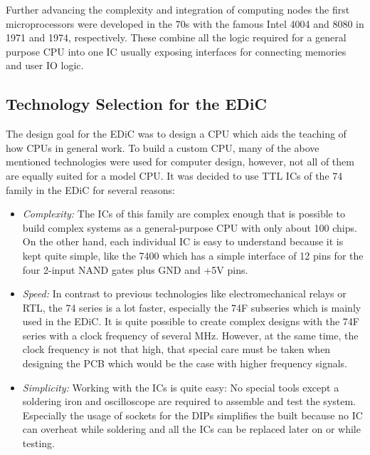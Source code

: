 Further advancing the complexity and integration of computing nodes the first microprocessors were developed in the 70s with the famous Intel 4004 and 8080 in 1971 and 1974, respectively.
These combine all the logic required for a general purpose \gls{CPU} into one \gls{IC} usually exposing interfaces for connecting memories and user \gls{IO} logic.

\subsection{Technology Selection for the \gls{EDiC}}
The design goal for the \gls{EDiC} was to design a \gls{CPU} which aids the teaching of how \glspl{CPU} in general work.
To build a custom \gls{CPU}, many of the above mentioned technologies were used for computer design, however, not all of them are equally suited for a model \gls{CPU}.
It was decided to use \gls{TTL} \glspl{IC} of the 74 family in the \gls{EDiC} for several reasons:
\begin{itemize}
  \item \emph{Complexity:} The \glspl{IC} of this family are complex enough that is possible to build complex systems as a general-purpose \gls{CPU} with only about 100 chips.
  On the other hand, each individual \gls{IC} is easy to understand because it is kept quite simple, like the 7400 which has a simple interface of 12 pins for the four 2-input NAND gates plus GND and +5V pins.

  \item \emph{Speed:} In contrast to previous technologies like electromechanical relays or \gls{RTL}, the 74 series is a lot faster, especially the 74F subseries which is mainly used in the \gls{EDiC}.
  It is quite possible to create complex designs with the 74F series with a clock frequency of several \unit{\mega\hertz}.
  However, at the same time, the clock frequency is not that high, that special care must be taken when designing the \gls{PCB} which would be the case with higher frequency signals.

  \item \emph{Simplicity:} Working with the \glspl{IC} is quite easy: No special tools except a soldering iron and oscilloscope are required to assemble and test the system.
  Especially the usage of sockets for the \glspl{DIP} simplifies the built because no \gls{IC} can overheat while soldering and all the \glspl{IC} can be replaced later on or while testing.
\end{itemize}

